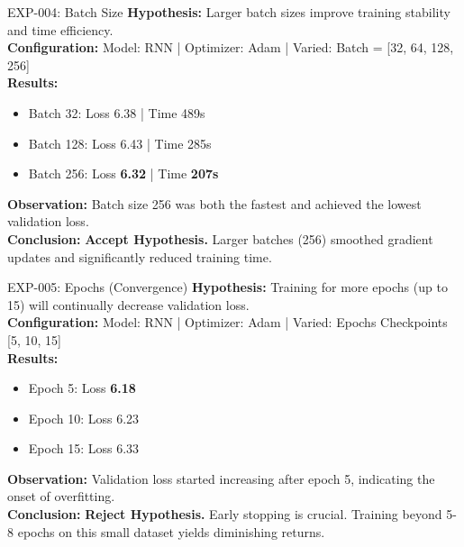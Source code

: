 \documentclass[12pt,a4paper]{article}
\begin{document}
\vspace{0.5cm}

\begin{experimentbox}{EXP-004: Batch Size}
\textbf{Hypothesis:} Larger batch sizes improve training stability and time efficiency. \\
\textbf{Configuration:} Model: RNN | Optimizer: Adam | Varied: Batch = [32, 64, 128, 256] \\
\textbf{Results:}
\begin{itemize}
    \item Batch 32: Loss 6.38 | Time 489s
    \item Batch 128: Loss 6.43 | Time 285s
    \item Batch 256: Loss \textbf{6.32} | Time \textbf{207s}
\end{itemize}
\textbf{Observation:} Batch size 256 was both the fastest and achieved the lowest validation loss. \\
\textbf{Conclusion:} \textbf{Accept Hypothesis.} Larger batches (256) smoothed gradient updates and significantly reduced training time.
\end{experimentbox}

\vspace{0.5cm}

\begin{experimentbox}{EXP-005: Epochs (Convergence)}
\textbf{Hypothesis:} Training for more epochs (up to 15) will continually decrease validation loss. \\
\textbf{Configuration:} Model: RNN | Optimizer: Adam | Varied: Epochs Checkpoints [5, 10, 15] \\
\textbf{Results:}
\begin{itemize}
    \item Epoch 5: Loss \textbf{6.18}
    \item Epoch 10: Loss 6.23
    \item Epoch 15: Loss 6.33
\end{itemize}
\textbf{Observation:} Validation loss started increasing after epoch 5, indicating the onset of overfitting. \\
\textbf{Conclusion:} \textbf{Reject Hypothesis.} Early stopping is crucial. Training beyond 5-8 epochs on this small dataset yields diminishing returns.
\end{experimentbox}

\vspace{0.5cm}
\end{document}
